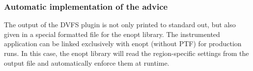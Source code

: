 \subsubsection{Automatic implementation of the advice}

The output of the DVFS plugin is not only printed to standard out, but also given in a special formatted file for the enopt library. The instrumented application can be linked exclusively with enopt (without PTF) for production runs. In this case, the enopt library will read the region-specific settings from the output file and automatically enforce them at runtime.


